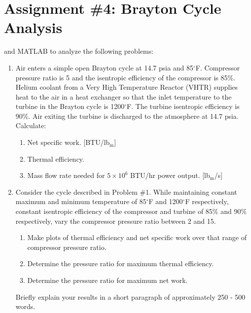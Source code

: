 \chapter{Assignment \#4: Brayton Cycle Analysis}
\label{ch:ass4}

\begin{fullwidth}
 and MATLAB to analyze the following problems:

\begin{enumerate}
\item Air enters a simple open Brayton cycle at 14.7 psia and 85$^{\circ}$F.  Compressor pressure ratio is 5 and the isentropic efficiency of the compressor is 85\%.  Helium coolant from a Very High Temperature Reactor (VHTR) supplies heat to the air in a heat exchanger so that the inlet temperature to the turbine in the Brayton cycle is 1200$^{\circ}$F.  The turbine isentropic efficiency is 90\%.  Air exiting the turbine is discharged to the atmosphere at 14.7 psia.  Calculate:
\begin{enumerate}
\item Net specific work. [BTU/lb$_\text{m}$]
\item Thermal efficiency.
\item Mass flow rate needed for $5 \times 10^6$ BTU/hr power output. [lb$_\text{m}$/s]
\end{enumerate}

\vspace{1.0cm}

\item Consider the cycle described in Problem \#1.  While maintaining constant maximum and minimum temperature of 85$^{\circ}$F and 1200$^{\circ}$F respectively, constant isentropic efficiency of the compressor and turbine of 85\% and 90\% respectively, vary the compressor pressure ratio between 2 and 15.
\begin{enumerate}
\item Make plots of thermal efficiency and net specific work over that range of compressor pressure ratio.
\item Determine the pressure ratio for maximum thermal efficiency.
\item Determine the pressure ratio for maximum net work.
\end{enumerate}
Briefly explain your results in a short paragraph of approximately 250 - 500 words.

\vspace{1.0cm}


\end{enumerate}
\end{fullwidth}
